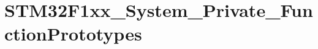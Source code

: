 \hypertarget{group__STM32F1xx__System__Private__FunctionPrototypes}{}\section{S\+T\+M32\+F1xx\+\_\+\+System\+\_\+\+Private\+\_\+\+Function\+Prototypes}
\label{group__STM32F1xx__System__Private__FunctionPrototypes}
